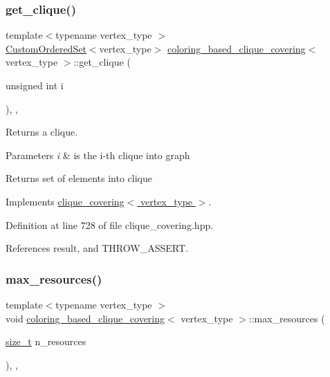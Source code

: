 \subsubsection{\texorpdfstring{get\+\_\+clique()}{get\_clique()}}
{\footnotesize\ttfamily template$<$typename vertex\+\_\+type $>$ \\
\hyperlink{classCustomOrderedSet}{Custom\+Ordered\+Set}$<$vertex\+\_\+type$>$ \hyperlink{classcoloring__based__clique__covering}{coloring\+\_\+based\+\_\+clique\+\_\+covering}$<$ vertex\+\_\+type $>$\+::get\+\_\+clique (\begin{DoxyParamCaption}\item[{unsigned int}]{i }\end{DoxyParamCaption})\hspace{0.3cm}{\ttfamily [inline]}, {\ttfamily [override]}, {\ttfamily [virtual]}}



Returns a clique. 


\begin{DoxyParams}{Parameters}
{\em i} & is the i-\/th clique into graph \\
\hline
\end{DoxyParams}
\begin{DoxyReturn}{Returns}
set of elements into clique 
\end{DoxyReturn}


Implements \hyperlink{classclique__covering_ab0ac09e6c1be800358fb327728a07146}{clique\+\_\+covering$<$ vertex\+\_\+type $>$}.



Definition at line 728 of file clique\+\_\+covering.\+hpp.



References result, and T\+H\+R\+O\+W\+\_\+\+A\+S\+S\+E\+RT.

\mbox{\label{classcoloring__based__clique__covering_ab2975cc7163940660b65d3c0b967cf9b}} 
\subsubsection{\texorpdfstring{max\+\_\+resources()}{max\_resources()}}
{\footnotesize\ttfamily template$<$typename vertex\+\_\+type $>$ \\
void \hyperlink{classcoloring__based__clique__covering}{coloring\+\_\+based\+\_\+clique\+\_\+covering}$<$ vertex\+\_\+type $>$\+::max\+\_\+resources (\begin{DoxyParamCaption}\item[{\hyperlink{tutorial__fpt__2017_2intro_2sixth_2test_8c_a7c94ea6f8948649f8d181ae55911eeaf}{size\+\_\+t}}]{n\+\_\+resources }\end{DoxyParamCaption})\hspace{0.3cm}{\ttfamily [inline]}, {\ttfamily [override]}, {\ttfamily [virtual]}}



